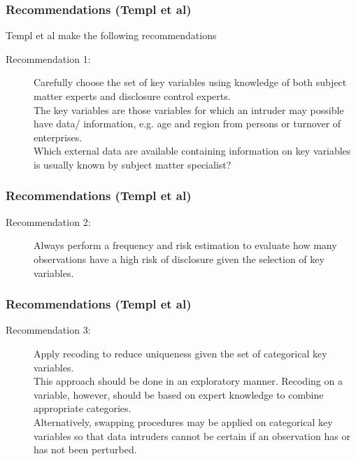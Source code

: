 \documentclass{beamer}
\begin{document}
\begin{frame}
\frametitle{Recommendations (Templ et al)}



	Templ et al make the following recommendations
	\begin{description}
		\item[Recommendation 1:] Carefully choose the set of key variables using knowledge
		of both subject matter experts and disclosure control experts. \\ The key variables are those variables for which an intruder may possible
		have data/ information, e.g. age and region from persons or turnover of enterprises. \\ Which external data are available containing information on key variables
		is usually known by subject matter specialist?

\end{description}
\end{frame}
\begin{frame}
	\frametitle{Recommendations (Templ et al)}
	\begin{description}
		\item[Recommendation 2:] Always perform a frequency and risk estimation to evaluate
		how many observations have a high risk of disclosure given the selection of key
		variables.
\end{description}
\end{frame}
\begin{frame}
	\frametitle{Recommendations (Templ et al)}
	\begin{description}
		\item[Recommendation 3:] Apply recoding to reduce uniqueness given the set of categorical key variables.\\ This approach should be done in an exploratory manner.
		Recoding on a variable, however, should be based on expert knowledge to
		combine appropriate categories. \\ Alternatively, swapping procedures may be applied on categorical key variables so that data intruders cannot be certain if an
		observation has or has not been perturbed.
\end{description}
\end{frame}
\end{document}
